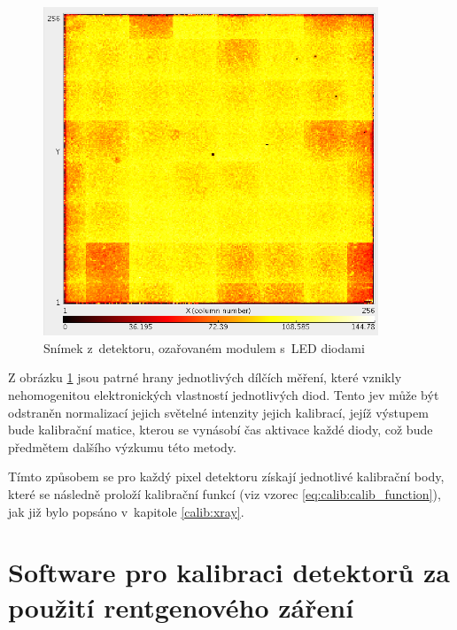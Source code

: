 \begin{figure}[th]
	\begin{center}
		\includegraphics[width=10cm]{figures/led_calib_frame.png}
		\caption{Snímek z~detektoru, ozařovaném modulem s~LED diodami}
		\label{fig:calib:led_frame}
	\end{center}
\end{figure}

Z obrázku \ref{fig:calib:led_frame} jsou patrné hrany jednotlivých dílčích měření, které vznikly nehomogenitou elektronických vlastností jednotlivých diod. Tento jev může být odstraněn normalizací jejich světelné intenzity jejich kalibrací, jejíž výstupem bude kalibrační matice, kterou se vynásobí čas aktivace každé diody, což bude předmětem dalšího výzkumu této metody.

Tímto způsobem se pro každý pixel detektoru získají jednotlivé kalibrační body, které se následně proloží kalibrační funkcí (viz vzorec \ref{eq:calib:calib_function}), jak již bylo popsáno v~kapitole \ref{calib:xray}.


\section{Software pro kalibraci detektorů za použití rentgenového záření}\label{calib:sw}


